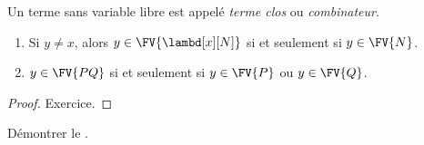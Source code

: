 \documentclass[../../../include/open-logic-section]{subfiles}
\begin{document}
\begin{defn}
Un terme sans variable libre est appelé
\emph{terme clos} ou \emph{combinateur}.
\end{defn}

\begin{lem}
\begin{enumerate}
  \item {} Si $y \neq x$, alors
    $y \in \FV{\lambd[x][N]}$ si et seulement si
    $y \in \FV{N}$.
  \item {} $y \in \FV{PQ}$ si et
    seulement si $y \in \FV{P}$ ou
    $y \in \FV{Q}$.
\end{enumerate}
\end{lem}

\begin{proof}
Exercice.
\end{proof}

\begin{prob}
Démontrer le .
\end{prob}
\end{document}
